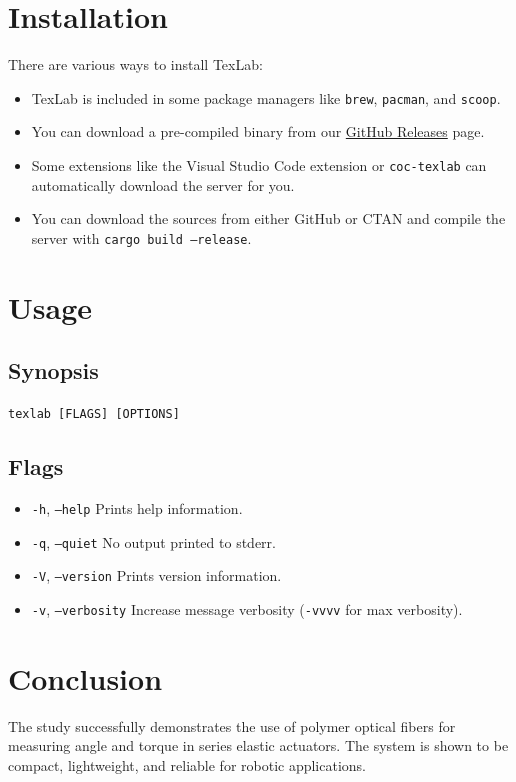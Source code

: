 \documentclass[journal]{IEEEtran}  %
\begin{document}
\section{Installation}
There are various ways to install TexLab:
\begin{itemize}
    \item TexLab is included in some package managers like \texttt{brew}, \texttt{pacman}, and \texttt{scoop}.
    \item You can download a pre-compiled binary from our \href{https://github.com/latex-lsp/texlab/releases}{GitHub Releases} page.
    \item Some extensions like the Visual Studio Code extension or \texttt{coc-texlab} can automatically download the server for you.
    \item You can download the sources from either GitHub or CTAN and compile the server with \texttt{cargo build --release}.
\end{itemize}

\section{Usage}
\subsection{Synopsis}
\texttt{texlab [FLAGS] [OPTIONS]}

\subsection{Flags}
\begin{itemize}
    \item \texttt{-h}, \texttt{--help} Prints help information.
    \item \texttt{-q}, \texttt{--quiet} No output printed to stderr.
    \item \texttt{-V}, \texttt{--version} Prints version information.
    \item \texttt{-v}, \texttt{--verbosity} Increase message verbosity (\texttt{-vvvv} for max verbosity).
\end{itemize}

\section{Conclusion}
The study successfully demonstrates the use of polymer optical fibers for measuring angle and torque in series elastic actuators. The system is shown to be compact, lightweight, and reliable for robotic applications.
\end{document}
